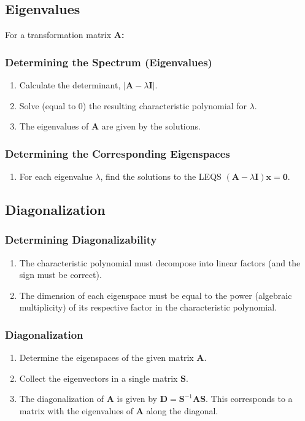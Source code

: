 \documentclass[10pt,twoside,twocolumn]{article}
\begin{document}
\subsection{Eigenvalues}

For a transformation matrix \textbf{$\mathbf{A}$:}


\subsubsection{Determining the Spectrum (Eigenvalues)}
\begin{enumerate}
\item Calculate the determinant, $\left|\mathbf{A}-\lambda\mathbf{I}\right|$. 
\item Solve (equal to 0) the resulting characteristic polynomial for $\lambda$. 
\item The eigenvalues of $\mathbf{A}$ are given by the solutions. 
\end{enumerate}

\subsubsection{Determining the Corresponding Eigenspaces}
\begin{enumerate}
\item For each eigenvalue $\lambda$, find the solutions to the LEQS $\left(\mathbf{A}-\lambda\mathbf{I}\right)\mathbf{x}=\mathbf{0}$. 
\end{enumerate}

\subsection{Diagonalization}


\subsubsection{Determining Diagonalizability}
\begin{enumerate}
\item The characteristic polynomial must decompose into linear factors (and
the sign must be correct). 
\item The dimension of each eigenspace must be equal to the power (algebraic
multiplicity) of its respective factor in the characteristic polynomial.
\end{enumerate}

\subsubsection{Diagonalization}
\begin{enumerate}
\item Determine the eigenspaces of the given matrix $\mathbf{A}$.
\item Collect the eigenvectors in a single matrix $\mathbf{S}$.
\item The diagonalization of $\mathbf{A}$ is given by $\mathbf{D}=\mathbf{S}^{-1}\mathbf{A}\mathbf{S}$.
This corresponds to a matrix with the eigenvalues of $\mathbf{A}$
along the diagonal.
\end{enumerate}
\end{document}
